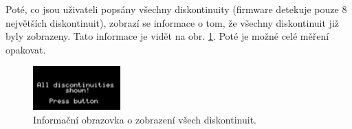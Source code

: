 Poté, co jsou uživateli popsány všechny diskontinuity (firmware detekuje pouze 8 největších diskontinuit), zobrazí se informace o tom, že všechny diskontinuit již byly zobrazeny. Tato informace je vidět na obr. \ref{discontinuities_shown}. Poté je možné celé měření opakovat.
\begin{figure}[H]
\includegraphics[width=0.3\textwidth,keepaspectratio,interpolate=false]{images/discontinuities_shown.png}\caption{Informační obrazovka o zobrazení všech diskontinuit.}\label{discontinuities_shown}
\end{figure}

